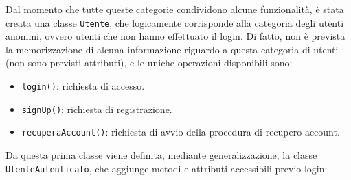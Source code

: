 \documentclass[11pt, a4paper]{article}
\theoremstyle{definition} %
\begin{document}
Dal momento che tutte queste categorie condividono alcune funzionalità, è stata
creata una classe \texttt{Utente}, che logicamente corrisponde alla categoria
degli utenti anonimi, ovvero utenti che non hanno effettuato il login. Di fatto,
non è prevista la memorizzazione di alcuna informazione riguardo a questa categoria
di utenti (non sono previsti attributi), e le uniche operazioni disponibili sono:
\begin{itemize}
    \item \texttt{login()}: richiesta di accesso.
    \item \texttt{signUp()}: richiesta di registrazione.
    \item \texttt{recuperaAccount()}: richiesta di avvio della procedura di recupero account.
\end{itemize}
Da questa prima classe viene definita, mediante generalizzazione, la classe
\texttt{UtenteAutenticato}, che aggiunge metodi e attributi accessibili previo
login:
\end{document}
